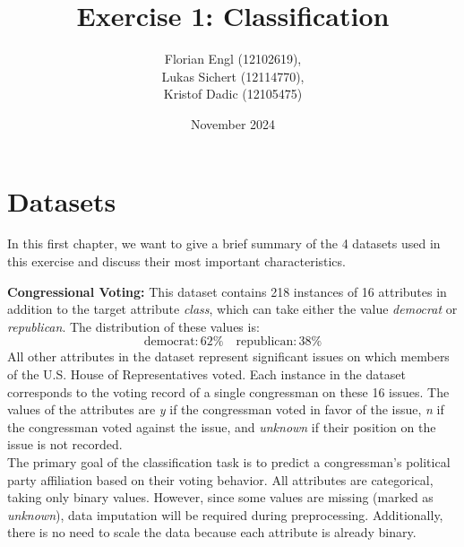 \documentclass[a4paper,10pt]{article}
\title{Exercise 1: Classification}
\author{Florian Engl (12102619),\\ Lukas Sichert (12114770),\\ Kristof Dadic (12105475)}
\date{November 2024}
\begin{document}
\maketitle



\section{Datasets}

In this first chapter, we want to give a brief summary of the 4 datasets used in this exercise and discuss their most important characteristics.

\textbf{Congressional Voting:} This dataset contains 218 instances of 16 attributes in addition to the target attribute \emph{class}, which can take either the value \emph{democrat} or \emph{republican}. The distribution of these values is:
\begin{equation*}
    \text{democrat:}\,62\% \quad \text{republican:}\,38\%
\end{equation*}
All other attributes in the dataset represent significant issues on which members of the U.S. House of Representatives voted. Each instance in the dataset corresponds to the voting record of a single congressman on these 16 issues. The values of the attributes are \emph{y} if the congressman voted in favor of the issue, \emph{n} if the congressman voted against the issue, and \emph{unknown} if their position on the issue is not recorded. \\
The primary goal of the classification task is to predict a congressman’s political party affiliation based on their voting behavior. All attributes are categorical, taking only binary values. However, since some values are missing (marked as \emph{unknown}), data imputation will be required during preprocessing. Additionally, there is no need to scale the data because each attribute is already binary.
\end{document}
